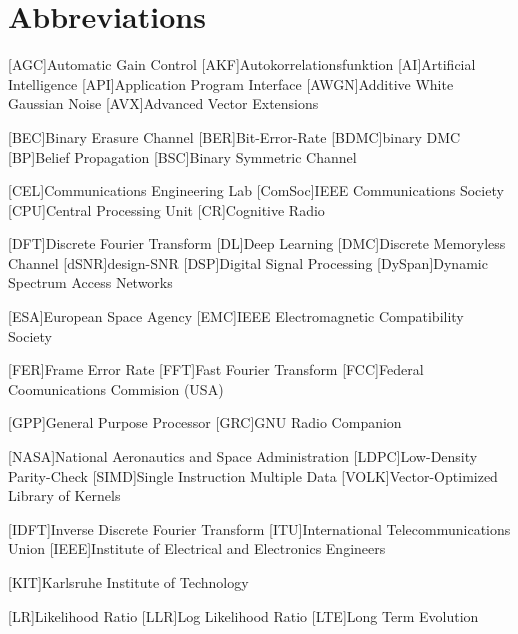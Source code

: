 \chapter{Abbreviations}
\begin{acronym}[TROLL]
  [AGC]{Automatic Gain Control}
  [AKF]{Autokorrelationsfunktion}
  [AI]{Artificial Intelligence}
  [API]{Application Program Interface}
  [AWGN]{Additive White Gaussian Noise}
  [AVX]{Advanced Vector Extensions}

  [BEC]{Binary Erasure Channel}
  [BER]{Bit-Error-Rate}
  [BDMC]{binary \acs{DMC}}
  [BP]{Belief Propagation}
  [BSC]{Binary Symmetric Channel}

  [CEL]{Communications Engineering Lab}
  [ComSoc]{IEEE Communications Society}
  [CPU]{Central Processing Unit}
  [CR]{Cognitive Radio}

  [DFT]{Discrete Fourier Transform}
  [DL]{Deep Learning}
  [DMC]{Discrete Memoryless Channel}
  [dSNR]{design-\ac{SNR}}
  [DSP]{Digital Signal Processing}
  [DySpan]{Dynamic Spectrum Access Networks}

  [ESA]{European Space Agency}
  [EMC]{IEEE Electromagnetic Compatibility Society}

  [FER]{Frame Error Rate}
  [FFT]{Fast Fourier Transform}
  [FCC]{Federal Coomunications Commision (USA)}

  [GPP]{General Purpose Processor}
  [GRC]{GNU Radio Companion}

  [NASA]{National Aeronautics and Space Administration}
  [LDPC]{Low-Density Parity-Check}
  [SIMD]{Single Instruction Multiple Data}
  [VOLK]{Vector-Optimized Library of Kernels}

  [IDFT]{Inverse Discrete Fourier Transform}
  [ITU]{International Telecommunications Union}
  [IEEE]{Institute of Electrical and Electronics Engineers}

  [KIT]{Karlsruhe Institute of Technology}

  [LR]{Likelihood Ratio}
  [LLR]{Log Likelihood Ratio}
  [LTE]{Long Term Evolution}


\end{acronym}
